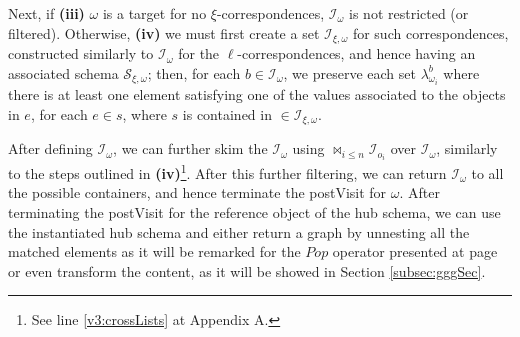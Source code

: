 \begin{example}[continues=ex:examplegraphdata,label=ex:examplereferencedOcaml]
{\narrower Next, if \textbf{(iii)} $\omega$ is a target for no $\xi$-correspondences, $\mathcal{I}_\omega$ is not restricted (or filtered). Otherwise, \textbf{(iv)} we must first create a set $\mathcal{I}_{\xi,\omega}$ for such correspondences, constructed similarly to $\mathcal{I}_\omega$ for the $\ell$-correspondences, and hence having an associated schema $\mathcal{S}_{\xi,\omega}$; then, for each $b\in \mathcal{I}_\omega$, we preserve each set $\lambda_{\omega_i}^b$ where there is at least one element satisfying one of the values associated to the objects in $e$, for each $e\in s$, where $s$ is contained in $\in\mathcal{I}_{\xi,\omega}$.\par}
\medskip

After defining $\mathcal{I}_\omega$, we can further skim the $\mathcal{I}_\omega$ using $\bowtie_{i\leq n}\mathcal{I}_{o_i}$ over $\mathcal{I}_\omega$, similarly to the steps outlined in \textbf{(iv)}\footnote{See line \vref{v3:crossLists} at Appendix A.}. After this further filtering, we can return $\mathcal{I}_\omega$ to all the possible containers, and hence terminate the postVisit for $\omega$. After terminating the postVisit for the reference object of the hub schema, we can use the instantiated hub schema and either return a graph by unnesting all the matched elements as it will be remarked for the $Pop$ operator presented at page \pageref{eq:popGraph} or even transform the content, as it will be showed in Section \vref{subsec:gggSec}. %


\end{example}
